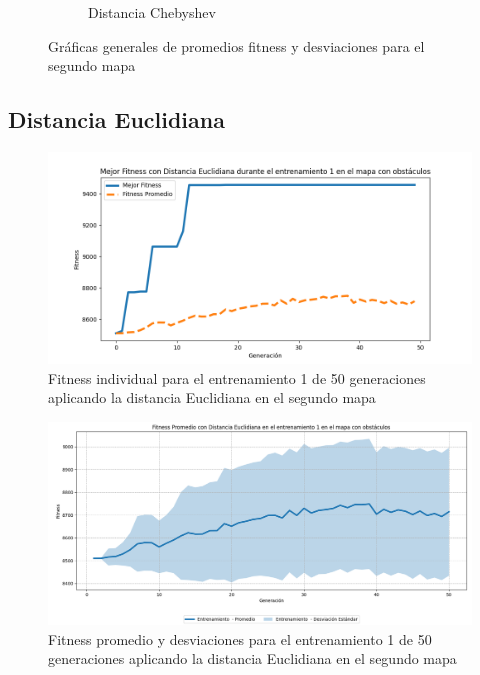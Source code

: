 \documentclass[conference]{IEEEtran}
\begin{document}
\begin{figure}[ht]
\begin{subfigure}{0.3\textwidth}
        \caption{Distancia Chebyshev}
        \label{fig:chebyshev_mapa2}
    \end{subfigure}
    \caption{Gráficas generales de promedios fitness y desviaciones para el segundo mapa}
    \label{fig:graficas_generales_mapa2}

\end{figure}

\subsection{Distancia Euclidiana}
\begin{figure}[H]
    \centering
    \includegraphics[width=0.9 \linewidth]{Euclidiana/Mapa2/Fitness_1_Map2_Eucli_50Gen.png}
    \caption{Fitness individual para el entrenamiento 1 de 50 generaciones aplicando la distancia Euclidiana en el segundo mapa}
    \label{fig:eucli_1_50_m2}
\end{figure}
\begin{figure}[H]
    \centering
    \includegraphics[width=0.9 \linewidth]{Euclidiana/Mapa2/Fitness_1_Map2_Eucli_50Gen_Sombra.png}
    \caption{Fitness promedio y desviaciones para el entrenamiento 1 de 50 generaciones aplicando la distancia Euclidiana en el segundo mapa}
    \label{fig:eucli_1_50_sombra_m2}
\end{figure}
\end{document}
